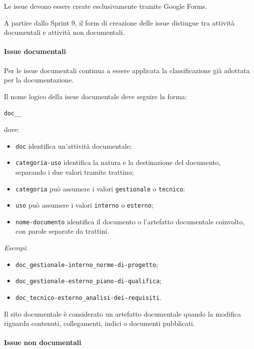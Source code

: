 Le issue devono essere create esclusivamente tramite Google Forms.

A partire dallo Sprint 9, il form di creazione delle issue distingue tra attività
documentali e attività non documentali.

\paragraph{Issue documentali}

Per le issue documentali continua a essere applicata la classificazione già
adottata per la documentazione.

Il nome logico della issue documentale deve seguire la forma:

\begin{center}
    \texttt{doc\_<categoria-uso>\_<nome-documento>}
\end{center}

dove:

\begin{itemize}
    \item \texttt{doc} identifica un'attività documentale;
    \item \texttt{categoria-uso} identifica la natura e la destinazione del documento,
    separando i due valori tramite trattino;
    \item \texttt{categoria} può assumere i valori \texttt{gestionale} o
    \texttt{tecnico};
    \item \texttt{uso} può assumere i valori \texttt{interno} o \texttt{esterno};
    \item \texttt{nome-documento} identifica il documento o l'artefatto documentale
    coinvolto, con parole separate da trattini.
\end{itemize}

\textit{Esempi}:

\begin{itemize}
    \item \texttt{doc\_gestionale-interno\_norme-di-progetto};
    \item \texttt{doc\_gestionale-esterno\_piano-di-qualifica};
    \item \texttt{doc\_tecnico-esterno\_analisi-dei-requisiti}.
\end{itemize}

Il sito documentale è considerato un artefatto documentale quando la modifica
riguarda contenuti, collegamenti, indici o documenti pubblicati.

\paragraph{Issue non documentali}

